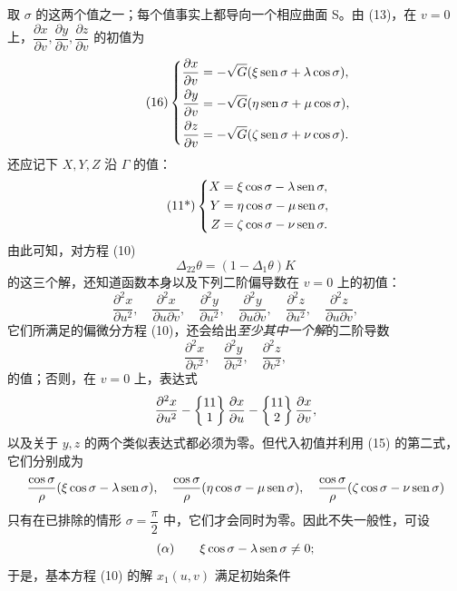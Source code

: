 取 \(\sigma\) 的这两个值之一；每个值事实上都导向一个相应曲面 S。由 (13)，在 \(v=0\) 上，\(\dfrac{\partial x}{\partial v},\dfrac{\partial y}{\partial v},\dfrac{\partial z}{\partial v}\) 的初值为
\begin{equation}\tag{16}
\left\{
\begin{aligned}
\frac{\partial x}{\partial v}&=-\sqrt G(\xi\operatorname{sen}\sigma+\lambda\cos\sigma),\\
\frac{\partial y}{\partial v}&=-\sqrt G(\eta\operatorname{sen}\sigma+\mu\cos\sigma),\\
\frac{\partial z}{\partial v}&=-\sqrt G(\zeta\operatorname{sen}\sigma+\nu\cos\sigma).
\end{aligned}
\right.
\end{equation}
还应记下 \(X,Y,Z\) 沿 \(\Gamma\) 的值：
\begin{equation}\tag{11*}
\left\{
\begin{aligned}
X&=\xi\cos\sigma-\lambda\operatorname{sen}\sigma,\\
Y&=\eta\cos\sigma-\mu\operatorname{sen}\sigma,\\
Z&=\zeta\cos\sigma-\nu\operatorname{sen}\sigma.
\end{aligned}
\right.
\end{equation}
由此可知，对方程 (10)
\[
 \Delta_{22}\theta=(1-\Delta_1\theta)K
\]
的这三个解，还知道函数本身以及下列二阶偏导数在 \(v=0\) 上的初值：
\[
 \frac{\partial^2x}{\partial u^2},\quad
 \frac{\partial^2x}{\partial u\partial v},\quad
 \frac{\partial^2y}{\partial u^2},\quad
 \frac{\partial^2y}{\partial u\partial v},\quad
 \frac{\partial^2z}{\partial u^2},\quad
 \frac{\partial^2z}{\partial u\partial v},
\]
它们所满足的偏微分方程 (10)，还会给出\emph{至少其中一个解}的二阶导数
\[
 \frac{\partial^2x}{\partial v^2},\quad
 \frac{\partial^2y}{\partial v^2},\quad
 \frac{\partial^2z}{\partial v^2},
\]
的值；否则，在 \(v=0\) 上，表达式
\[
 \frac{\partial^2x}{\partial u^2}-\left\{\begin{matrix}11\\1\end{matrix}\right\}\frac{\partial x}{\partial u}-\left\{\begin{matrix}11\\2\end{matrix}\right\}\frac{\partial x}{\partial v},
\]
以及关于 \(y,z\) 的两个类似表达式都必须为零。但代入初值并利用 (15) 的第二式，它们分别成为
\[
\frac{\cos\sigma}{\rho}(\xi\cos\sigma-\lambda\operatorname{sen}\sigma),\quad
\frac{\cos\sigma}{\rho}(\eta\cos\sigma-\mu\operatorname{sen}\sigma),\quad
\frac{\cos\sigma}{\rho}(\zeta\cos\sigma-\nu\operatorname{sen}\sigma)
\]
只有在已排除的情形 \(\sigma=\dfrac{\pi}{2}\) 中，它们才会同时为零。因此不失一般性，可设
\[
(\alpha)\qquad \xi\cos\sigma-\lambda\operatorname{sen}\sigma\neq0;
\]
于是，基本方程 (10) 的解 \(x_1(u,v)\) 满足初始条件
